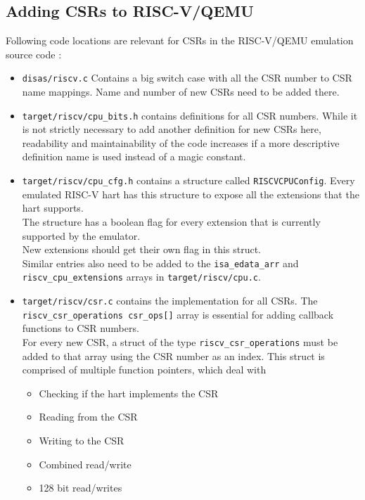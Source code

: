 

\subsection{Adding CSRs to RISC-V/QEMU}

Following code locations are relevant for CSRs in the RISC-V/QEMU emulation source code \cite{QEMUSource2024}:
\begin{itemize}
    \item \texttt{disas/riscv.c} Contains a big switch case with all the CSR number to CSR name mappings.
          Name and number of new CSRs need to be added there.
    \item \texttt{target/riscv/cpu\_bits.h} contains definitions for all CSR numbers.
          While it is not strictly necessary to add another definition for new CSRs here, readability and maintainability
          of the code increases if a more descriptive definition name is used instead of a magic constant.
    \item \texttt{target/riscv/cpu\_cfg.h} contains a structure called \texttt{RISCVCPUConfig}. Every emulated RISC-V hart
          has this structure to expose all the extensions that the hart supports. \\
          The structure has a boolean flag for every extension that is currently supported by the emulator.\\
          New extensions should get their own flag in this struct.\\
          Similar entries also need to be added to the \texttt{isa\_edata\_arr} and \texttt{riscv\_cpu\_extensions} arrays in \texttt{target/riscv/cpu.c}.
    \item \texttt{target/riscv/csr.c} contains the implementation for all CSRs. The \texttt{riscv\_csr\_operations csr\_ops[]}
          array is essential for adding callback functions to CSR numbers.\\
          For every new CSR, a struct of the type \texttt{riscv\_csr\_operations} must be added to that array using the
          CSR number as an index. This struct is comprised of multiple function pointers, which deal with
          \begin{itemize}
              \item Checking if the hart implements the CSR
              \item Reading from the CSR
              \item Writing to the CSR
              \item Combined read/write
              \item 128 bit read/writes
          \end{itemize}
\end{itemize}


